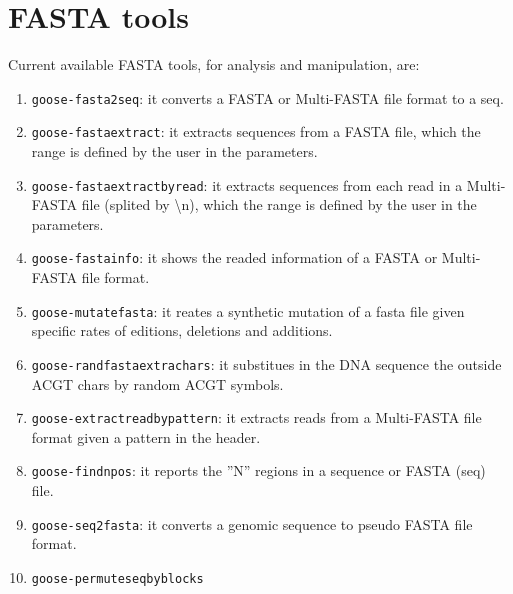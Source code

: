 \chapter{FASTA tools}
\label{fasta}

Current available FASTA tools, for analysis and manipulation, are:
\begin{enumerate}
\item \texttt{goose-fasta2seq}: it converts a FASTA or Multi-FASTA file format to a seq.
\item \texttt{goose-fastaextract}: it extracts sequences from a FASTA file, which the range is defined by the user in the parameters.
\item \texttt{goose-fastaextractbyread}: it extracts sequences from each read in a Multi-FASTA file (splited by \textbackslash n), which the range is defined by the user in the parameters.
\item \texttt{goose-fastainfo}: it shows the readed information of a FASTA or Multi-FASTA file format.
\item \texttt{goose-mutatefasta}: it reates a synthetic mutation of a fasta file given specific rates of editions, deletions and additions.
\item \texttt{goose-randfastaextrachars}: it substitues in the DNA sequence the outside ACGT chars by random ACGT symbols.
\item \texttt{goose-extractreadbypattern}: it extracts reads from a Multi-FASTA file format given a pattern in the header.
\item \texttt{goose-findnpos}: it reports the ''N'' regions in a sequence or FASTA (seq) file.
\item \texttt{goose-seq2fasta}: it converts a genomic sequence to pseudo FASTA file format.
\item \texttt{goose-permuteseqbyblocks}

\end{enumerate}




 





%


